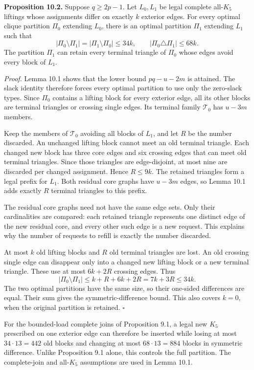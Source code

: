 \documentclass[english,11pt,a4paper]{article}
\begin{document}
\textbf{Proposition 10.2.} Suppose \(q\ge2p-1\). Let \(L_0,L_1\) be
legal complete all-\(K_5\) liftings whose assignments differ on exactly
\(k\) exterior edges. For every optimal clique partition \(\Pi_0\)
extending \(L_0\), there is an optimal partition \(\Pi_1\) extending
\(L_1\) such that \[
|\Pi_0\setminus\Pi_1|=|\Pi_1\setminus\Pi_0|\le34k,
\qquad |\Pi_0\triangle\Pi_1|\le68k.
\] The partition \(\Pi_1\) can retain every terminal triangle of
\(\Pi_0\) whose edges avoid every block of \(L_1\).

\emph{Proof.} Lemma 10.1 shows that the lower bound \(pq-u-2m\) is
attained. The slack identity therefore forces every optimal partition to
use only the zero-slack types. Since \(\Pi_0\) contains a lifting block
for every exterior edge, all its other blocks are terminal triangles or
crossing single edges. Its terminal family \(\mathcal T_0\) has \(u-3m\)
members.

Keep the members of \(\mathcal T_0\) avoiding all blocks of \(L_1\), and
let \(R\) be the number discarded. An unchanged lifting block cannot
meet an old terminal triangle. Each changed new block has three core
edges and six crossing edges that can meet old terminal triangles. Since
those triangles are edge-disjoint, at most nine are discarded per
changed assignment. Hence \(R\le9k\). The retained triangles form a
legal prefix for \(L_1\). Both residual core graphs have \(u-3m\) edges,
so Lemma 10.1 adds exactly \(R\) terminal triangles to this prefix.

The residual core graphs need not have the same edge sets. Only their
cardinalities are compared: each retained triangle represents one
distinct edge of the new residual core, and every other such edge is a
new request. This explains why the number of requests to refill is
exactly the number discarded.

At most \(k\) old lifting blocks and \(R\) old terminal triangles are
lost. An old crossing single edge can disappear only into a changed new
lifting block or a new terminal triangle. These use at most \(6k+2R\)
crossing edges. Thus \[
|\Pi_0\setminus\Pi_1|\le k+R+6k+2R
=7k+3R\le34k.
\] The two optimal partitions have the same size, so their one-sided
differences are equal. Their sum gives the symmetric-difference bound.
This also covers \(k=0\), when the original partition is retained.
\(\square\)

For the bounded-load complete joins of Proposition 9.1, a legal new
\(K_5\) prescribed on one exterior edge can therefore be inserted while
losing at most \(34\cdot13=442\) old blocks and changing at most
\(68\cdot13=884\) blocks in symmetric difference. Unlike Proposition 9.1
alone, this controls the full partition. The complete-join and
all-\(K_5\) assumptions are used in Lemma 10.1.
\end{document}
